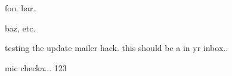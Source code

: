 foo. bar.

baz, etc.

testing the update mailer hack.  this should be a \delta in yr inbox..

mic checka... 123
